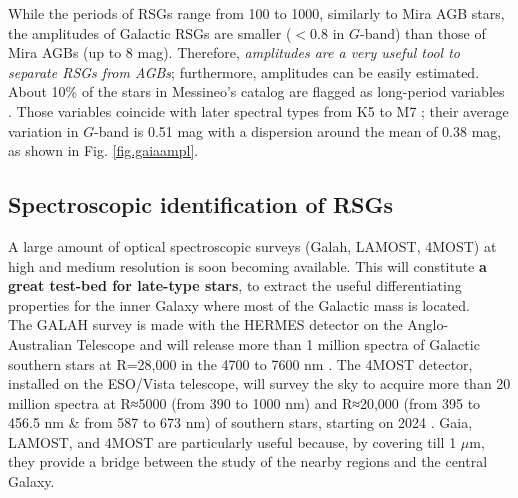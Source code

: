 \documentclass[final,11pt,onecolumn,a4paper,twoside]{scrbook_gj}
\newcommand{\um}{$\mu$m}
\begin{document}
While the periods of RSGs range from 100 to 1000, similarly to
Mira AGB stars, the amplitudes of Galactic RSGs are
smaller ($<0.8$ in $G$-band) than those of Mira AGBs (up to 8 mag).
Therefore, {\it 
amplitudes are a very useful tool  to separate RSGs from AGBs}; 
furthermore,  amplitudes can be easily estimated. 
About 10\% of the stars in  Messineo's catalog  
are flagged as long-period variables \citep{holl18}. 
Those variables coincide  with later spectral types from K5 to M7
\citep{messineo20var};
their average variation in $G$-band is 0.51 mag with a 
dispersion around the mean of 0.38 mag,
as shown in Fig. \ref{fig.gaiaampl}. 


\subsection{Spectroscopic identification of RSGs}

A large amount of optical spectroscopic surveys (Galah, 
LAMOST, 4MOST) at high and medium resolution 
is soon becoming available. This will constitute 
{\bf a great test-bed for late-type stars},  
to extract the useful differentiating properties 
for the inner Galaxy where most of the Galactic 
mass is located.\\
The  GALAH survey is made with the HERMES detector
on the Anglo-Australian Telescope and will release more 
than 1 million spectra of Galactic southern stars 
at R=28,000 in the 4700 to 7600 nm \citep[e.g.][]{sharma20}. 
The 4MOST detector, installed on the ESO/Vista telescope,
will survey the sky to acquire more than 20 million spectra 
at R≈5000 (from 390 to 1000 nm) and R≈20,000 
(from 395 to 456.5 nm \& from 587 to 673 nm) 
of southern stars, starting on 2024 
\citep[e.g.,][]{deJong12}.
Gaia, LAMOST, and 4MOST are particularly useful because,
by covering till 1 \um, they provide a bridge between the
study of the nearby regions and the central Galaxy.
\end{document}
